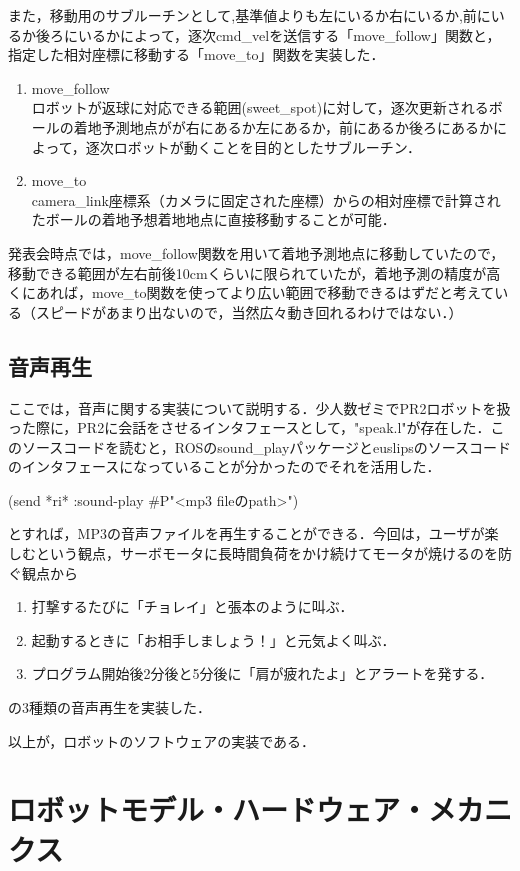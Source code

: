 \documentclass[10pt, oneside, titlepage]{ltjarticle}  %
\begin{document}
  また，移動用のサブルーチンとして,基準値よりも左にいるか右にいるか,前にいるか後ろにいるかによって，逐次cmd\_velを送信する「move\_follow」関数と，指定した相対座標に移動する「move\_to」関数を実装した．
  \begin{enumerate}
    \item move\_follow \\
      ロボットが返球に対応できる範囲(sweet\_spot)に対して，逐次更新されるボールの着地予測地点がが右にあるか左にあるか，前にあるか後ろにあるかによって，逐次ロボットが動くことを目的としたサブルーチン．
      
    \item move\_to \\
      camera\_link座標系（カメラに固定された座標）からの相対座標で計算されたボールの着地予想着地地点に直接移動することが可能．
  \end{enumerate}

  発表会時点では，move\_follow関数を用いて着地予測地点に移動していたので，移動できる範囲が左右前後10cmくらいに限られていたが，着地予測の精度が高くにあれば，move\_to関数を使ってより広い範囲で移動できるはずだと考えている（スピードがあまり出ないので，当然広々動き回れるわけではない．）

  \subsection{音声再生}
  ここでは，音声に関する実装について説明する．少人数ゼミでPR2ロボットを扱った際に，PR2に会話をさせるインタフェースとして，"speak.l"が存在した\cite{sound}．このソースコードを読むと，ROSのsound\_playパッケージとeuslipsのソースコードのインタフェースになっていることが分かったのでそれを活用した．

  (send *ri* :sound-play \#P"<mp3 fileのpath>")

  とすれば，MP3の音声ファイルを再生することができる．今回は，ユーザが楽しむという観点，サーボモータに長時間負荷をかけ続けてモータが焼けるのを防ぐ観点から
  \begin{enumerate}
    \item 打撃するたびに「チョレイ」と張本のように叫ぶ．
    \item 起動するときに「お相手しましょう！」と元気よく叫ぶ．
    \item プログラム開始後2分後と5分後に「肩が疲れたよ」とアラートを発する．
  \end{enumerate}
  の3種類の音声再生を実装した．

  以上が，ロボットのソフトウェアの実装である．
\section{ロボットモデル・ハードウェア・メカニクス}
\end{document}
